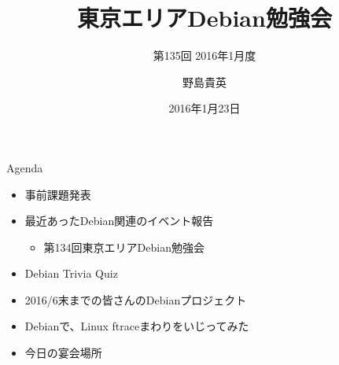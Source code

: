\title{東京エリアDebian勉強会}
\subtitle{第135回 2016年1月度}
\author{野島貴英}
\date{2016年1月23日}



\begin{frame}
\titlepage{}
\end{frame}

\begin{frame}{Agenda}
 \begin{minipage}[t]{0.45\hsize}
  \begin{itemize}
   \item 事前課題発表
   \item 最近あったDebian関連のイベント報告
	 \begin{itemize}
	 \item 第134回東京エリアDebian勉強会
	 \end{itemize}
  \end{itemize}
 \end{minipage} 
 \begin{minipage}[t]{0.45\hsize}
  \begin{itemize}
   \item Debian Trivia Quiz
   \item 2016/6末までの皆さんのDebianプロジェクト
   \item Debianで、Linux ftraceまわりをいじってみた
   \item 今日の宴会場所
  \end{itemize}
 \end{minipage}
\end{frame}

